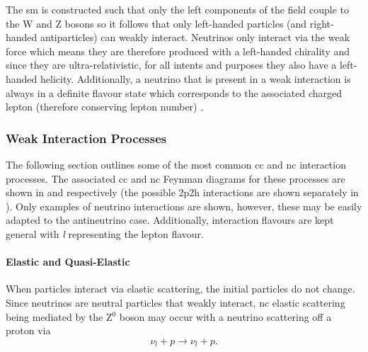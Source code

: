 The \gls{sm} is constructed such that only the left components of the field couple to the W and Z bosons so it follows that only left-handed particles (and right-handed antiparticles) can weakly interact. Neutrinos only interact via the weak force which means they are therefore produced with a left-handed chirality and since they are ultra-relativistic, for all intents and purposes they also have a left-handed helicity. Additionally, a neutrino that is present in a weak interaction is always in a definite flavour state which corresponds to the associated charged lepton (therefore conserving lepton number) \cite{Quarks_and_Leptons:_An_Introductor_Course_in_Modern_Particle_Physics_book}.

\subsubsection{Weak Interaction Processes}

The following section outlines some of the most common \gls{cc} and \gls{nc} interaction processes. The associated \gls{cc} and \gls{nc} Feynman diagrams for these processes are shown in  and  respectively (the possible \gls{2p2h} interactions are shown separately in ). Only examples of neutrino interactions are shown, however, these may be easily adapted to the antineutrino case. Additionally, interaction flavours are kept general with \textit{l} representing the lepton flavour.

\paragraph{Elastic and Quasi-Elastic}
When particles interact via elastic scattering, the initial particles do not change. Since neutrinos are neutral particles that weakly interact, \gls{nc} elastic scattering being mediated by the Z$^0$ boson may occur with a neutrino scattering off a proton via
\begin{equation}
    \nu_l + p \rightarrow \nu_l + p.
\end{equation}

